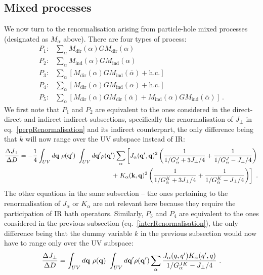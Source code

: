 \documentclass[%
reprint,
superscriptaddress,
groupedaddress,
superscriptaddress,
onecolumn,
10pt
]{revtex4-2}
\begin{document}
\subsection{Mixed processes}
We now turn to the renormalisation arising from particle-hole mixed processes (designated as \(M_\alpha\) above). There are four types of process:
\begin{equation}\begin{aligned}
	P_1:& \sum_\alpha M_\text{dir}(\alpha) G M_\text{dir}(\alpha)\\
	P_2:& \sum_\alpha M_\text{ind}(\alpha) G M_\text{ind}(\alpha)\\
	P_3:& \sum_\alpha \left[M_\text{dir}(\alpha) G M_\text{ind}(\bar\alpha) + \text{h.c.}\right]\\
	P_4:& \sum_\alpha \left[M_\text{dir}(\alpha) G M_\text{ind}(\alpha) + \text{h.c.}\right]\\
	P_5:& \sum_\alpha \left[M_\text{dir}(\alpha) G M_\text{dir}(\bar\alpha) + M_\text{ind}(\alpha) G M_\text{ind}(\bar\alpha)\right]~.
\end{aligned}\end{equation}
We first note that \(P_1\) and \(P_2\) are equivalent to the ones considered in the direct-direct and indirect-indirect subsections, specifically the renormalisation of \(J_\perp\) in eq.~\ref{perpRenormalisation} and its indirect counterpart, the only difference being that \(k\) will now range over the UV subspace instead of IR:
\begin{equation}\begin{aligned}
	\frac{\Delta J_\perp}{\Delta D} = -\frac{1}{4}\int_{UV} d{\bf q} ~\rho({\bf q}^\prime)~\int_{UV} d{\bf q}^\prime \rho({\bf q}^\prime) \sum_\alpha \left[J_\alpha({\bf q}^\prime, {\bf q})^2\left(\frac{1}{1/G_\alpha^{J} + 3J_\perp/4} + \frac{1}{1/G_\alpha^{J} - J_\perp/4}\right) \right.\\
	+ \left.K_\alpha({\bf k}, {\bf q})^2\left(\frac{1}{1/ G_{\bar\alpha}^K + 3J_\perp/4} + \frac{1}{1/ G_{\bar\alpha}^K - J_\perp/4}\right)\right]~.
\end{aligned}\end{equation}
The other equations in the same subsection -- the ones pertaining to the renormalisation of \(J_\alpha\) or \(K_\alpha\) are not relevant here because they require the participation of IR bath operators. Similarly, \(P_3\) and \(P_4\) are equivalent to the ones considered in the previous subsection (eq.~\ref{interRenormalisation}), the only difference being that the dummy variable \(k\) in the previous subsection would now have to range only over the UV subspace:
\begin{equation}\begin{aligned}
	\frac{\Delta J_\perp}{\Delta D} = \int_{UV} d{\bf q} ~\rho({\bf q})~\int_{UV} d{\bf q}^\prime \rho({\bf q}^\prime) \sum_{\alpha} \frac{J_\alpha(q, q^\prime)K_{\bar\alpha}(q^\prime, q)}{1/G^{JK}_\alpha - J_\perp / 4}~.
\end{aligned}\end{equation}
\end{document}
